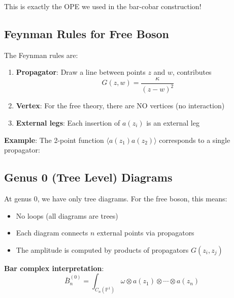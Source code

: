 This is exactly the OPE we used in the bar-cobar construction!

\subsection{Feynman Rules for Free Boson}

The Feynman rules are:
\begin{enumerate}
\item \textbf{Propagator}: Draw a line between points $z$ and $w$, contributes
\begin{equation}
G(z,w) = \frac{\kappa}{(z-w)^2}
\end{equation}

\item \textbf{Vertex}: For the free theory, there are NO vertices (no interaction)

\item \textbf{External legs}: Each insertion of $a(z_i)$ is an external leg
\end{enumerate}

\textbf{Example}: The 2-point function $\langle a(z_1) a(z_2) \rangle$ corresponds to a single propagator:

\begin{center}
\end{center}

\subsection{Genus 0 (Tree Level) Diagrams}

At genus 0, we have only tree diagrams. For the free boson, this means:
\begin{itemize}
\item No loops (all diagrams are trees)
\item Each diagram connects $n$ external points via propagators
\item The amplitude is computed by products of propagators $G(z_i, z_j)$
\end{itemize}

\textbf{Bar complex interpretation}:
\begin{equation}
\bar{B}^{(0)}_n = \int_{C_n(\mathbb{P}^1)} \omega \otimes a(z_1) \otimes \cdots \otimes a(z_n)
\end{equation}

